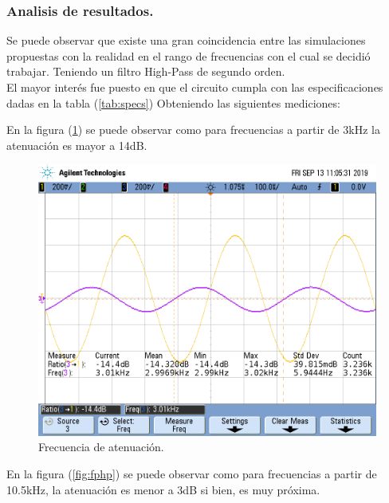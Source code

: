 \documentclass[a4paper]{article}
\begin{document}
\subsubsection{Analisis de resultados.} 
Se puede observar que existe una gran coincidencia entre las simulaciones propuestas con la realidad en el rango de frecuencias con el cual se decidió trabajar. Teniendo un filtro High-Pass de segundo orden.\\
El mayor interés fue puesto en que el circuito cumpla con las especificaciones dadas en la tabla (\ref{tab:specs})
Obteniendo las siguientes mediciones:


En la figura (\ref{fig:fahp}) se puede observar como para frecuencias a partir de 3kHz la atenuación es mayor a 14dB.
\begin{figure}[H]	
	\centering
	\includegraphics[width=\textwidth]{ImagenesEj2/MedicionesGrilla/fa_hp.png}
	\caption{Frecuencia de atenuación.}
	\label{fig:fahp}
\end{figure}

En la figura (\ref{fig:fphp}) se puede observar como para frecuencias a partir de 10.5kHz, la atenuación es menor a 3dB si bien, es muy próxima.
\end{document}
